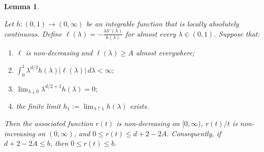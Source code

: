 \documentclass[11pt]{article}
\newtheorem{lemma}{Lemma}
\theoremstyle{definition}
\begin{document}
\begin{lemma}
\label{lemma51}

Let $h:(0,1)\to(0,\infty)$ be an integrable function that is
locally absolutely continuous. Define $\ell(\lambda) = -\frac{\lambda h'(\lambda)}{h(\lambda)}$ for almost every $\lambda\in(0,1)$. Suppose that:

\begin{enumerate}
    \item $\ell$ is non-decreasing and $\ell(\lambda)\geq A$ almost everywhere;

    \item $ \int_0^1
    \lambda^{d/2}h(\lambda)|\ell(\lambda)|\,d\lambda
    <\infty;$

    \item $\lim_{\lambda\downarrow0}
    \lambda^{d/2+1}h(\lambda)=0;$

    \item the finite limit $ h_1:=\lim_{\lambda\uparrow1}h(\lambda)$ exists.
\end{enumerate}
Then the associated function $r(t)$ is non-decreasing on
$[0,\infty)$, $r(t)/t$ is non-increasing on $(0,\infty)$, and $0\leq r(t)\leq d+2-2A.$ Consequently, if $d+2-2A\leq b$, then $0\leq r(t)\leq b.$
\end{lemma}
\end{document}
